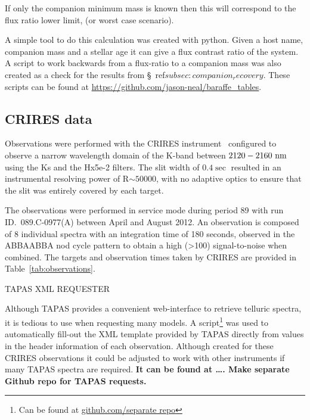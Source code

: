 If only the companion minimum mass is known then this will correspond to the flux ratio lower limit, (or worst case scenario).


A simple tool to do this calculation was created with python. Given a host name, companion mass and a stellar age it can give a flux contrast ratio of the system. A script to work backwards from a flux-ratio to a companion mass was also created as a check for the results from \S~ref$ {subsec:companion_recovery}$. These scripts can be found at \url{https://github.com/jason-neal/baraffe_tables}.


\subsection{CRIRES data}
\label{subsec:CRIRESdata}
Observations were performed with the CRIRES instrument~\citep{kaeufl_crires_2004} configured to observe a narrow wavelength domain of the K-band between \(\rm2120-2160~nm \) using the Ks and the Hx5e-2 filters. The slit width of \(0.4\sec \) resulted in an instrumental resolving power of R\(\sim50000 \), with no adaptive optics to ensure that the slit was entirely covered by each target.

The observations were performed in service mode during period 89 with run ID.~089.C-0977(A) between April and August 2012. An observation is composed of 8 individual spectra with an integration time of 180 seconds, observed in the ABBAABBA nod cycle pattern to obtain a high (>100) signal-to-noise when combined. The targets and observation times taken by CRIRES are provided in Table~\ref{tab:observations}.




TAPAS XML REQUESTER

Although TAPAS provides a convenient web-interface to retrieve telluric spectra, it is tedious to use when requesting many models. A script\footnote{Can be found at \url{github.com/separate repo}} was used to automatically fill-out the XML template provided by TAPAS directly from values in the header information of each observation. Although created for these CRIRES observations it could be adjusted to work with other instruments if many TAPAS spectra are required. \textbf{It can be found at \ldots. Make separate Github repo for TAPAS requests.}










